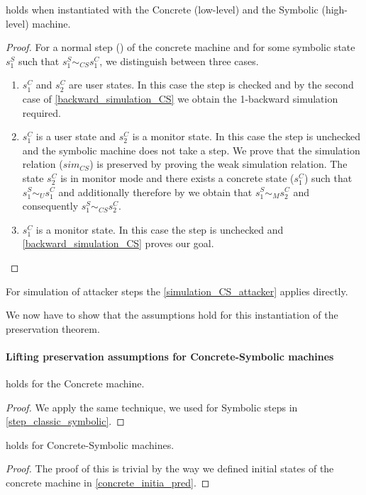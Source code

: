 \begin{theorem}
\label{backward_refinement_normal_CS}
  holds when instantiated
 with the Concrete (low-level) and the Symbolic (high-level) machine.
\end{theorem}
\begin{proof}
  For a normal step () of the concrete machine and
  for some symbolic state $s^S_1$ such that $s^S_1 \sim_{CS} s^C_1$,
  we distinguish between three cases.

  \begin{enumerate}
  \item $s^C_1$ and $s^C_2$ are user states. In this case the step is
    checked and by the second case of \cref{backward_simulation_CS} we obtain
    the 1-backward simulation required.
  \item $s^C_1$ is a user state and $s^C_2$ is a monitor state. In this case
    the step is unchecked and the symbolic machine does not take a step.
    We prove that the simulation relation ($sim_{CS}$) is preserved by
    proving the weak simulation relation. The state $s^C_2$ is in
    monitor mode and there exists a concrete state ($s^C_1$) such that
    $s^S_1 \sim_U s^C_1$ and additionally  therefore
    by  we obtain that
    $s^S_1 \sim_M s^C_2$ and consequently $s^S_1 \sim_{CS} s^C_2$.
  \item $s^C_1$ is a monitor state. In this case the step is
    unchecked and \cref{backward_simulation_CS} proves
    our goal.
  \end{enumerate}
\end{proof}

For simulation of attacker steps the \cref{simulation_CS_attacker}
applies directly.

We now have to show that the assumptions
hold for this instantiation of the preservation theorem.

\paragraph{Lifting preservation assumptions for Concrete-Symbolic machines}

\begin{lemma}
  \label{step_classic_concrete}
   holds for the Concrete machine.
\end{lemma}
\begin{proof}
  We apply the same technique, we used for Symbolic steps in
  \cref{step_classic_symbolic}.
\end{proof}
\begin{lemma}
  \label{initial_refine_CS}
   holds for Concrete-Symbolic machines.
\end{lemma}
\begin{proof}
  The proof of this is trivial by the way we defined initial states of
  the concrete machine in \cref{concrete_initia_pred}.
\end{proof}

